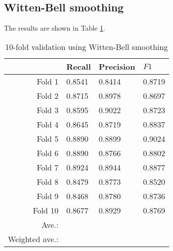 \documentclass[12pt]{homework}
\begin{document}
\subsection{Witten-Bell smoothing}
The results are shown in Table \ref{wbresult}.
\begin{table}
	\begin{center}
	\begin{tabular}{r | l l l}
		\hline
		&	Recall	&	Precision& $F1$ \\
		\hline
	Fold 1  &	0.8541	 &	0.8414	 &	0.8719\\
	Fold 2  &	0.8715	 &	0.8978	 &	0.8697\\
	Fold 3  &	0.8595	 &	0.9022	 &	0.8723\\
	Fold 4  &	0.8645	 &	0.8719	 &	0.8837\\
	Fold 5  &	0.8890	 &	0.8899	 &	0.9024\\
	Fold 6  &	0.8890	 &	0.8766	 &	0.8802\\
	Fold 7  &	0.8924	 &	0.8944	 &	0.8877\\
	Fold 8  &	0.8479	 &	0.8773	 &	0.8520\\
	Fold 9  &	0.8468	 &	0.8780	 &	0.8736\\
	Fold 10 &	0.8677	 &	0.8929	 &	0.8769\\
		\hline
		Ave.: &		&		&			\\
		Weighted ave.: &	&	&			\\
		\hline
	\end{tabular}

	\end{center}
	\caption{10-fold validation using Witten-Bell smoothing}
	\label{wbresult}
\end{table}
\end{document}
